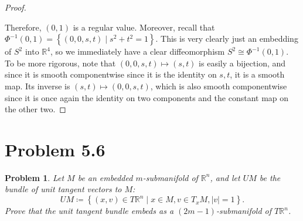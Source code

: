 \documentclass[11pt, letterpaper]{article}
\theoremstyle{plain}
\newtheorem{problem}{Problem}[section]
\begin{document}
\begin{proof}
\begin{itemize}
	\end{itemize}
	Therefore, $(0,1)$ is a regular value. Moreover, recall that $\Phi ^{-1} (0,1)=\left\{ (0,0,s,t)\mid s^2+t^2=1 \right\} $. This is very clearly just an embedding of $S^2$ into $\mathbb{R} ^4$, so we immediately have a clear diffeomorphism $S^2 \cong \Phi ^{-1} (0,1)$. To be more rigorous, note that $(0,0,s,t)\mapsto (s,t)$ is easily a bijection, and since it is smooth componentwise since it is the identity on $s,t$, it is a smooth map. Its inverse is $(s,t)\mapsto (0,0,s,t)$, which is also smooth componentwise since it is once again the identity on two components and the constant map on the other two.
\end{proof}

\section{Problem 5.6}
\begin{problem}
	Let $M$ be an embedded $m$-submanifold of $\mathbb{R} ^n$, and let $UM$ be the bundle of unit tangent vectors to $M$:
	\[
		UM\coloneqq \left\{ (x,v)\in T\mathbb{R} ^n\mid x\in M,v\in T_xM,\left| v \right| =1 \right\} 
	.\]
	Prove that the unit tangent bundle embeds as a $(2m-1)$-submanifold of $T\mathbb{R} ^n$.
\end{problem}
\end{document}

